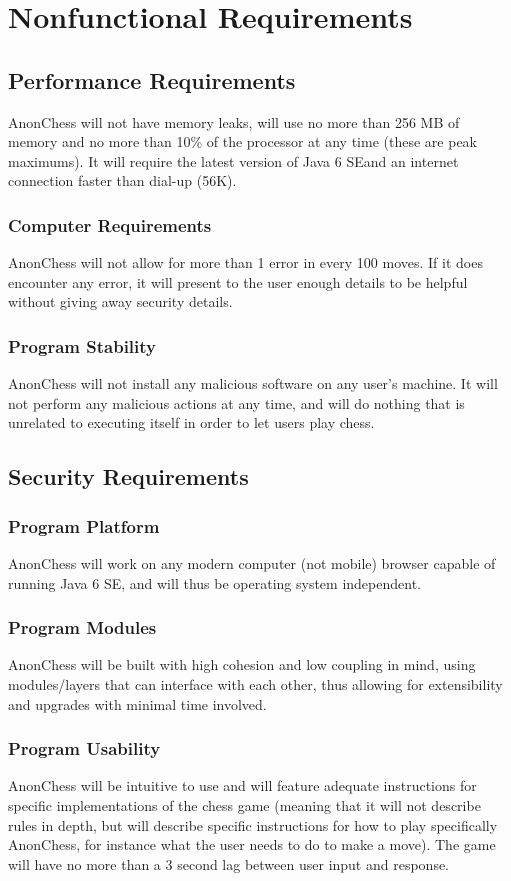 \section{Nonfunctional Requirements}
\subsection{Performance Requirements}
AnonChess will not have memory leaks, will use no more than 256 MB of memory and no more than 10\% of the processor 
at any time (these are peak maximums). It will require the latest version of Java 6 SEand an internet connection faster 
than dial-up (56K).
\subsubsection{Computer Requirements}
AnonChess will not allow for more than 1 error in every 100 moves. If it does encounter any error, it will present 
to the user enough details to be helpful without giving away security details.
\subsubsection{Program Stability}
AnonChess will not install any malicious software on any user's machine. It will not perform any malicious actions 
at any time, and will do nothing that is unrelated to executing itself in order to let users play chess.
\subsection{Security Requirements}
\subsubsection{Program Platform}
AnonChess will work on any modern computer (not mobile) browser capable of running Java 6 SE, and will thus be operating 
system independent.
\subsubsection{Program Modules}
AnonChess will be built with high cohesion and low coupling in mind, using modules/layers that can interface with 
each other, thus allowing for extensibility and upgrades with minimal time involved.
\subsubsection{Program Usability}
AnonChess will be intuitive to use and will feature adequate instructions for specific implementations of the chess 
game (meaning that it will not describe rules in depth, but will describe specific instructions for how to play 
specifically AnonChess, for instance what the user needs to do to make a move). The game will have no more than a 3 
second lag between user input and response.


